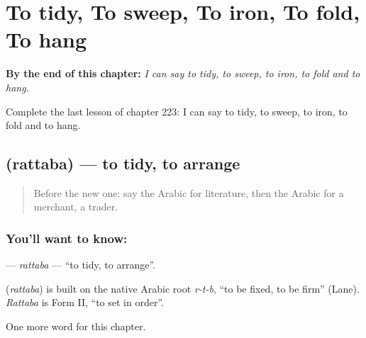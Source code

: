 
\chapter{To tidy, To sweep, To iron, To fold, To hang}
\label{ch:ar-to-tidy-to-sweep-to-iron-to-fold-to-hang}

\begin{chapteropening}
\textbf{By the end of this chapter:} \emph{I can say to tidy, to sweep, to iron, to fold and to hang.}

Complete the last lesson of chapter 223: I can say to tidy, to sweep, to iron, to fold and to hang.
\end{chapteropening}

\section[\texorpdfstring{\ar{رتب} (rattaba)}{رتب (rattaba)}]{ (rattaba) — to tidy, to arrange}

\label{lesson:AR-C223-rattaba}



\begin{quote}
Before the new one: say the Arabic for literature, then the Arabic for a merchant, a trader.
\end{quote}

\subsection*{You'll want to know: }
\textbf{} — \emph{rattaba} — \textquotedblleft{}to tidy, to arrange\textquotedblright{}.

\begin{cousinweb}
\textbf{} (\emph{rattaba}) is built on the native Arabic root \emph{r-t-b}, \textquotedblleft{}to be fixed, to be firm\textquotedblright{} (Lane). \emph{Rattaba} is Form II, \textquotedblleft{}to set in order\textquotedblright{}.
\end{cousinweb}

\begin{grammarlens}[title={What you've built}]
One more word for this chapter.
\end{grammarlens}

